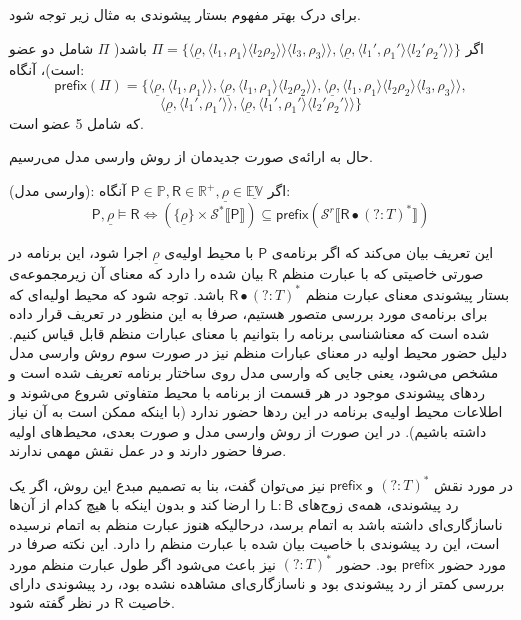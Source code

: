 برای درک بهتر مفهوم بستار پیشوندی به مثال زیر توجه شود.
\begin{exm}
	اگر 
	$\Pi = \{\langle\underline{\rho},\langle l_1 , \rho_1 \rangle 
	\langle l_2  \rho_2 \rangle\rangle  \langle l_3 , \rho_3 \rangle\rangle 
	,
	\langle\underline{\rho},\langle {l_1}' , {\rho_1}' \rangle  \langle {l_2}'  {\rho_2}' \rangle\rangle
	\}$
	باشد( $\Pi$ شامل دو عضو است)، آنگاه:
	$$
	\mathsf{prefix}(\Pi)=
	\{
	\langle\underline{\rho},\langle l_1 , \rho_1 \rangle\rangle ,
	\langle\underline{\rho},\langle l_1 , \rho_1 \rangle  \langle l_2  \rho_2 \rangle\rangle,
	\langle\underline{\rho},\langle l_1 , \rho_1 \rangle  \langle l_2  \rho_2 \rangle  \langle l_3 , \rho_3 \rangle\rangle ,$$
	$$
	\langle\underline{\rho},\langle {l_1}' , {\rho_1}' \rangle\rangle,
	\langle\underline{\rho},\langle {l_1}' , {\rho_1}' \rangle  \langle {l_2}'  {\rho_2}' \rangle\rangle
	\}
	$$
	که شامل 5 عضو است.
\end{exm}
حال به ارائه‌ی صورت جدیدمان از روش وارسی مدل می‌رسیم.
\begin{defn}
(وارسی مدل):
	اگر 
	$\mathsf{P}\in\mathbb{P} , \mathsf{R} \in \mathbb{R}^+ , \underline{\rho} \in \underline{\mathbb{EV}}$
	آنگاه:
	$$\mathsf{P},\underline{\rho} \models \mathsf{R}
	 \Leftrightarrow
	(\{\underline{\rho}\}\times \mathcal{S}^* \llbracket\mathsf{P}\rrbracket) \subseteq 
	\mathsf{prefix} (\mathcal{S}^r \llbracket\mathsf{R} \bullet (?:\mathit{T})^*\rrbracket)
	$$
\end{defn}

این تعریف بیان می‌کند که اگر برنامه‌ی 
$\mathsf{P}$
با محیط اولیه‌ی 
$\underline{\rho}$
اجرا شود، این برنامه در صورتی خاصیتی که با عبارت منظم 
$\mathsf{R}$
بیان شده را دارد که معنای آن زیرمجموعه‌ی بستار پیشوندی معنای عبارت منظم
$\mathsf{R} \bullet (?:\mathit{T})^*$
باشد.
توجه شود که محیط اولیه‌ای که برای برنامه‌ی مورد بررسی متصور هستیم، صرفا به این منظور در تعریف قرار داده شده است که معناشناسی برنامه را بتوانیم با معنای عبارات منظم قابل قیاس کنیم. دلیل حضور محیط اولیه در معنای عبارات منظم نیز در صورت سوم روش وارسی مدل مشخص می‌شود، یعنی جایی که وارسی مدل روی ساختار برنامه تعریف شده است و ردهای پیشوندی موجود در هر قسمت از برنامه با محیط متفاوتی شروع می‌شوند و اطلاعات محیط اولیه‌ی برنامه در این ردها حضور ندارد (با اینکه ممکن است به آن نیاز داشته باشیم). در این صورت از روش وارسی مدل و صورت بعدی، محیط‌های اولیه صرفا حضور دارند و در عمل نقش مهمی ندارند. 

در مورد نقش 
$ (?:\mathit{T})^*$
و
$ \mathsf{prefix} $
نیز می‌توان گفت، بنا به تصمیم مبدع این روش، اگر یک رد پیشوندی، همه‌ی زوج‌های 
$\mathsf{L:B}$
را ارضا کند و بدون اینکه با هیچ کدام از آن‌‌ها ناسازگاری‌ای داشته باشد به اتمام برسد، درحالیکه هنوز عبارت منظم به اتمام نرسیده است، این رد پیشوندی با خاصیت بیان شده با عبارت منظم را دارد. این نکته صرفا در مورد حضور 
$\mathsf{prefix}$ 
بود. حضور 
$(?:\mathit{T})^*$
نیز باعث می‌شود اگر طول عبارت منظم مورد بررسی کمتر از رد پیشوندی بود و ناسازگاری‌ای مشاهده نشده بود، رد پیشوندی دارای خاصیت $\mathsf{R}$ در نظر گفته شود.
